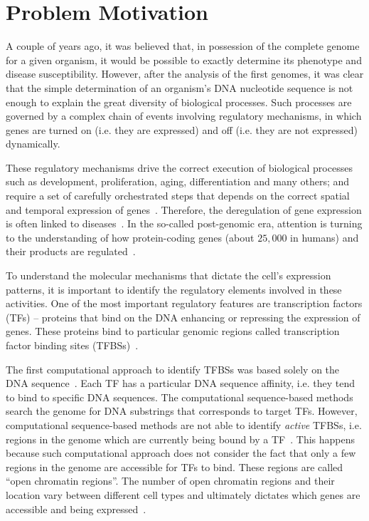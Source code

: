 \section{Problem Motivation}
\label{sec:problem.motivation}

A couple of years ago, it was believed that, in possession of the complete genome for a given organism, it would be possible to exactly determine its phenotype and disease susceptibility. However, after the analysis of the first genomes, it was clear that the simple determination of an organism's DNA nucleotide sequence is not enough to explain the great diversity of biological processes. Such processes are governed by a complex chain of events involving regulatory mechanisms, in which genes are turned on (i.e. they are expressed) and off (i.e. they are not expressed) dynamically.

These regulatory mechanisms drive the correct execution of biological processes such as development, proliferation, aging, differentiation and many others; and require a set of carefully orchestrated steps that depends on the correct spatial and temporal expression of genes~\citep{maston2006}. Therefore, the deregulation of gene expression is often linked to diseases~\citep{encode2012}. In the so-called post-genomic era, attention is turning to the understanding of how protein-coding genes (about $25,000$ in humans) and their products are regulated~\citep{maston2006}.

To understand the molecular mechanisms that dictate the cell's expression patterns, it is important to identify the regulatory elements involved in these activities. One of the most important regulatory features are transcription factors (TFs) -- proteins that bind on the DNA enhancing or repressing the expression of genes. These proteins bind to particular genomic regions called transcription factor binding sites (TFBSs)~\citep{maston2006}.

The first computational approach to identify TFBSs was based solely on the DNA sequence~\citep{stormo2000}. Each TF has a particular DNA sequence affinity, i.e. they tend to bind to specific DNA sequences. The computational sequence-based methods search the genome for DNA substrings that corresponds to target TFs. However, computational sequence-based methods are not able to identify \emph{active} TFBSs, i.e. regions in the genome which are currently being bound by a TF~\citep{pique2011}. This happens because such computational approach does not consider the fact that only a few regions in the genome are accessible for TFs to bind. These regions are called ``open chromatin regions''. The number of open chromatin regions and their location vary between different cell types and ultimately dictates which genes are accessible and being expressed~\citep{encode2012}.


